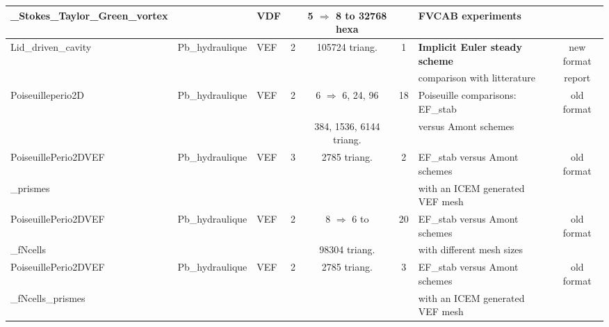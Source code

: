 \begin{table}[H]
\begin{centering}
\begin{longtable}{lclccclc}
\rowcolor{LimeGreen!10}\_Stokes\_Taylor\_Green\_vortex &  & VDF &  & 5 $\Rightarrow$ 8 to 32768 hexa &  & FVCAB experiments &  \\ \hline
\rowcolor{LimeGreen!10}Lid\_driven\_cavity & Pb\_hydraulique & VEF & 2 & 105724 triang. & 1 & \textbf{Implicit Euler steady scheme} & new format \\
\rowcolor{LimeGreen!10}& & & & & & comparison with litterature & report \\ \hline
\rowcolor{LimeGreen!10}Poiseuilleperio2D & Pb\_hydraulique & VEF & 2 & 6 $\Rightarrow$ 6, 24, 96 & 18 & Poiseuille comparisons: EF\_stab & old format \\
\rowcolor{LimeGreen!10} & & & & 384, 1536, 6144 triang. & & versus Amont schemes & \\ \hline
\rowcolor{LimeGreen!10}PoiseuillePerio2DVEF & Pb\_hydraulique & VEF & 3 & 2785 triang. & 2 & EF\_stab versus Amont schemes  & old format \\
\rowcolor{LimeGreen!10}\_prismes & & & & & & with an ICEM generated VEF mesh & \\ \hline
\rowcolor{LimeGreen!10}PoiseuillePerio2DVEF & Pb\_hydraulique & VEF & 2 & 8 $\Rightarrow$ 6 to  & 20 & EF\_stab versus Amont schemes & old format \\
\rowcolor{LimeGreen!10}\_fNcells & & & & 98304 triang. & & with different mesh sizes & \\ \hline
\rowcolor{LimeGreen!10}PoiseuillePerio2DVEF & Pb\_hydraulique & VEF & 2 & 2785 triang. & 3 & EF\_stab versus Amont schemes & old format \\
\rowcolor{LimeGreen!10}\_fNcells\_prismes & & & & & & with an ICEM generated VEF mesh &  \\ \hline

	\end{longtable}
\end{centering}
\end{table}
\newpage

